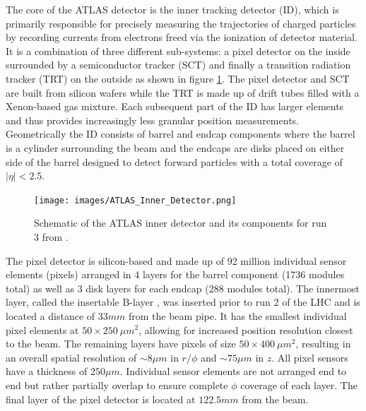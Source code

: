 The core of the ATLAS detector \cite{atlas-detector} is the inner tracking detector (ID), which is primarily responsible 
for precisely measuring the trajectories of charged particles by recording currents from electrons freed via the 
ionization of detector material. It is a combination of three different sub-systems: a pixel detector on the inside 
surrounded by a semiconductor tracker (SCT) and finally a transition radiation tracker (TRT) on the outside as shown in 
figure \ref{fig:ATLAS_Inner_Detector}. The pixel detector and SCT are built from silicon wafers while the TRT is made up 
of drift tubes filled with a Xenon-based gas mixture. Each subsequent part of the ID has larger elements and thus provides 
increasingly less granular position measurements. Geometrically the ID consists of barrel and endcap components where the 
barrel is a cylinder surrounding the beam and the endcaps are disks placed on either side of the barrel designed to detect 
forward particles with a total coverage of $|\eta| < 2.5$. \par

\begin{figure}
\centering
    \texttt{[image: images/ATLAS\_Inner\_Detector.png]}
    \caption{Schematic of the ATLAS inner detector and its components for run 3 from \cite{atlas-run3-setup}.}
    \label{fig:ATLAS_Inner_Detector}
\end{figure}

The pixel detector \cite{pernegger-pixel-detector} is silicon-based and made up of 92 million individual sensor 
elements (pixels) arranged in 4 layers for the barrel component (1736 modules total) as well as 3 disk layers for each 
endcap (288 modules total). The innermost layer, called the insertable B-layer \cite{atlas-insertable-b-layer}, was 
inserted prior to run 2 of the LHC and is located a distance of $33mm$ from the beam pipe. It has the smallest individual 
pixel elements at $50\times250\ \mu m^2$, allowing for increased position resolution closest to the beam. The remaining 
layers have pixels of size $50\times400\ \mu m^2$, resulting in an overall spatial resolution of $\sim 8 \mu m$ in 
$r/\phi$ and $\sim 75 \mu m$ in $z$. All pixel sensors have a thickness of $250 \mu m$. Individual sensor elements 
are not arranged end to end but rather partially overlap to ensure complete $\phi$ coverage of each layer. The final 
layer of the pixel detector is located at $122.5mm$ from the beam. \par

